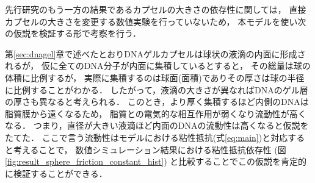 先行研究のもう一方の結果であるカプセルの大きさの依存性に関しては，
直接カプセルの大きさを変更する数値実験を行っていないため，
本モデルを使い次の仮説を検証する形で考察を行う．

第\ref{sec:dnagel}章で述べたとおりDNAゲルカプセルは球状の液滴の内面に形成されるが，
仮に全てのDNA分子が内面に集積しているとすると，
その総量は球の体積に比例するが，
実際に集積するのは球面(面積)でありその厚さは球の半径に比例することがわかる．
したがって，液滴の大きさが異なればDNAのゲル層の厚さも異なると考えられる．
このとき，より厚く集積するほど内側のDNAは脂質膜から遠くなるため，
脂質との電気的な相互作用が弱くなり流動性が高くなる．
つまり，直径が大きい液滴ほど内面のDNAの流動性は高くなると仮説をたてた．
ここで言う流動性はモデルにおける粘性抵抗(式\ref{eq:main})と対応すると考えることで，
数値シミュレーション結果における粘性抵抗依存性
(図\ref{fig:result_sphere_friction_constant_hist})
と比較することでこの仮説を肯定的に検証することができる．
